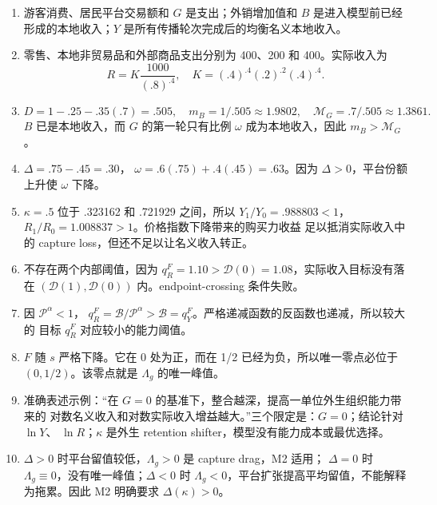 \documentclass[UTF8,11pt,scheme=chinese,fontset=windows]{ctexart}
\newcommand{\calB}{\mathcal B}
\newcommand{\calD}{\mathcal D}
\newcommand{\calP}{\mathcal P}
\newcommand{\MG}{\mathcal M_G}
\theoremstyle{definition}
\begin{document}
\begin{enumerate}
  \item 游客消费、居民平台交易额和 \(G\) 是支出；外销增加值和 \(B\) 是进入模型前已经
  形成的本地收入；\(Y\) 是所有传播轮次完成后的均衡名义本地收入。

  \item 零售、本地非贸易品和外部商品支出分别为 400、200 和 400。实际收入为
  \[
  R=K\frac{1000}{(.8)^{.4}},
  \quad K=(.4)^{.4}(.2)^{.2}(.4)^{.4}.
  \]

  \item
  \[
  D=1-.25-.35(.7)=.505,
  \quad m_B=1/.505\approx1.9802,
  \quad \MG=.7/.505\approx1.3861.
  \]
  \(B\) 已是本地收入，而 \(G\) 的第一轮只有比例 \(\omega\) 成为本地收入，因此
  \(m_B>\MG\)。

  \item \(\Delta=.75-.45=.30\)，
  \(\omega=.6(.75)+.4(.45)=.63\)。因为 \(\Delta>0\)，平台份额上升使
  \(\omega\) 下降。

  \item \(\kappa=.5\) 位于 .323162 和 .721929 之间，所以
  \(Y_1/Y_0=.988803<1\)，\(R_1/R_0=1.008837>1\)。价格指数下降带来的购买力收益
  足以抵消实际收入中的 capture loss，但还不足以让名义收入转正。

  \item 不存在两个内部阈值，因为 \(q_R^F=1.10>\calD(0)=1.08\)，实际收入目标没有落在
  \((\calD(1),\calD(0))\) 内。endpoint-crossing 条件失败。

  \item 因 \(\calP^\alpha<1\)，
  \(q_R^F=\calB/\calP^\alpha>\calB=q_Y^F\)。严格递减函数的反函数也递减，所以较大的
  目标 \(q_R^F\) 对应较小的能力阈值。

  \item \(F\) 随 \(s\) 严格下降。它在 0 处为正，而在 1/2 已经为负，所以唯一零点必位于
  \((0,1/2)\)。该零点就是 \(\Lambda_g\) 的唯一峰值。

  \item 准确表述示例：“在 \(G=0\) 的基准下，整合越深，提高一单位外生组织能力带来的
  对数名义收入和对数实际收入增益越大。”三个限定是：\(G=0\)；结论针对 \(\ln Y\)、
  \(\ln R\)；\(\kappa\) 是外生 retention shifter，模型没有能力成本或最优选择。

  \item \(\Delta>0\) 时平台留值较低，\(\Lambda_g>0\) 是 capture drag，M2 适用；
  \(\Delta=0\) 时 \(\Lambda_g\equiv0\)，没有唯一峰值；\(\Delta<0\) 时
  \(\Lambda_g<0\)，平台扩张提高平均留值，不能解释为拖累。因此 M2 明确要求
  \(\Delta(\kappa)>0\)。
\end{enumerate}
\end{document}
